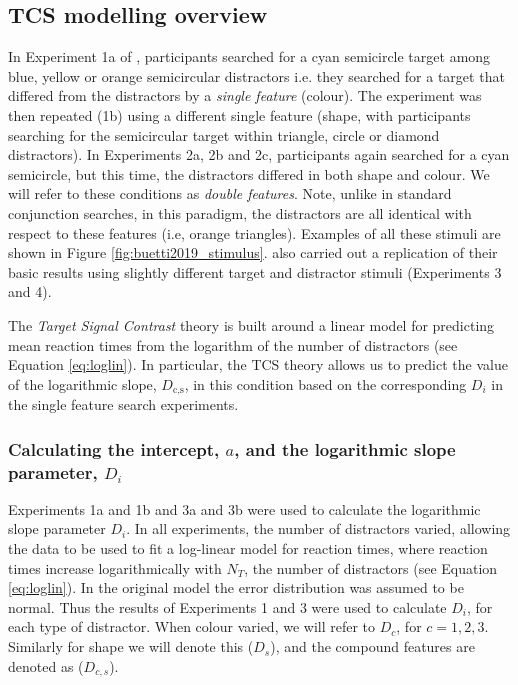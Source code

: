 \documentclass[preprint,12pt,authoryear]{elsarticle}
\begin{document}
\subsection{TCS modelling overview} 

In Experiment 1a of \cite{buetti2019predicting}, participants searched for a cyan semicircle target among blue, yellow or orange semicircular distractors i.e. they searched for a target that differed from the distractors by a \textit{single feature} (colour). The experiment was then repeated (1b) using a different single feature (shape, with participants searching for the semicircular target within triangle, circle or diamond distractors). In Experiments 2a, 2b and 2c, participants again searched for a cyan semicircle, but this time, the distractors differed in both shape and colour. We will refer to these conditions as \textit{double features}. Note, unlike in standard conjunction searches, in this paradigm, the distractors are all identical with respect to these features (i.e, orange triangles). Examples of all these stimuli are shown in Figure \ref{fig:buetti2019_stimulus}. \cite{buetti2019predicting} also carried out a replication of their basic results using slightly different target and distractor stimuli (Experiments 3 and 4).

The \textit{Target Signal Contrast} theory is built around a linear model for predicting mean reaction times from the logarithm of the number of distractors (see Equation \ref{eq:loglin}). In particular, the TCS theory allows us to predict the value of the logarithmic slope, $D_\text{c,s}$, in this condition based on the corresponding $D_i$ in the single feature search experiments. 

\subsubsection{Calculating the intercept, $a$, and the logarithmic slope parameter, $D_i$}
\label{sec:fitting_D}

Experiments 1a and 1b and 3a and 3b were used to calculate the logarithmic slope parameter $D_i$. In all experiments, the number of distractors varied, allowing the data to be used to fit a log-linear model for reaction times, where reaction times increase logarithmically with $N_T$, the number of distractors (see Equation \ref{eq:loglin}). In the original model the error distribution was assumed to be normal. Thus the results of Experiments 1 and 3 were used to calculate $D_i$, for each type of distractor. When colour varied, we will refer to $D_c$, for $c=1,2,3$. Similarly for shape we will denote this ($D_s$), and the compound features are denoted as ($D_{c,s}$). 
\end{document}

